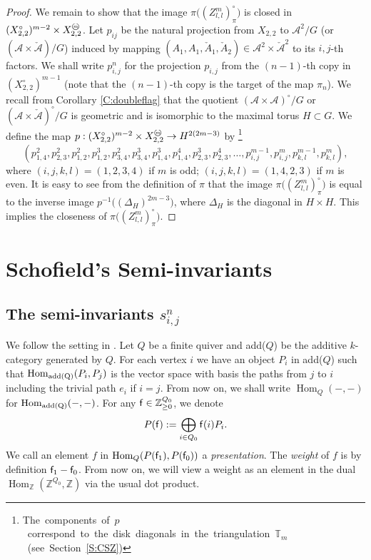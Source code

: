 \documentclass{amsart}
\theoremstyle{definition}
\theoremstyle{remark}
\numberwithin{equation}{section}
\DeclareMathOperator{\Hom}{Hom}
\newcommand{\mc}[1]{\mathcal{#1}}
\newcommand{\mb}[1]{\mathbb{#1}}
\newcommand{\mch}[1]{\check{\mathcal{#1}}}
\newcommand{\f}{{\sf f}}
\newcommand{\zllm}{{Z_{l,l}^m}}
\newcommand{\circm}{{\mathop{\text{\textcircled{\tiny \textit m}}}\nolimits}}
\newcommand{\ijn}{_{i,j}^{n}}
\begin{document}
\begin{proof}
We remain to show that the image $\pi\big((\zllm)^\circ_\pi\big)$ is closed in $(X_{2,2}^\circ)^{m-2} \times X_{2,2}^{\circm}$.
Let $p_{ij}$ be the natural projection from $X_{2,2}$ to $\mc{A}^2/G$ (or $(\mc{A}\times \mch{A})/G$) induced by 
mapping $\left(A_1,A_1,\check{A}_1,\check{A}_2\right)\in \mc{A}^2\times \mch{A}^2$ to its $i,j$-th factors.
We shall write $p_{i,j}^{n}$ for the projection $p_{i,j}$ from the $(n-1)$-th copy in $(X_{2,2}^\circ)^{m-1}$ (note that the $(n-1)$-th copy is the target of the map $\pi_n$).
We recall from Corollary \ref{C:doubleflag} that the quotient $(\mc{A}\times \mc{A})^\circ/G$ or $(\mc{A}\times \mch{A})^\circ/G$ is geometric and is isomorphic to the maximal torus $H\subset G$.
We define the map $p: (X_{2,2}^\circ)^{m-2} \times X_{2,2}^{\circm} \to H^{2(2m-3)}$ by \footnote{\hbox{The components of $p$ correspond to the disk diagonals in the triangulation $\mb{T}_m$ (see Section \ref{S:CSZ})}}
$$\left( p_{1,4}^{2},p_{2,3}^{2},p_{1,2}^{2},p_{1,2}^{3},p_{3,4}^{2},p_{3,4}^{3},p_{1,4}^{3},p_{1,4}^{4},p_{2,3}^{3},p_{2,3}^{4},\dots, p_{i,j}^{m-1},p_{i,j}^{m},p_{k,l}^{m-1},p_{k,l}^{m} \right),$$
where $(i,j,k,l)=(1,2,3,4)$ if $m$ is odd; $(i,j,k,l)=(1,4,2,3)$ if $m$ is even.
It is easy to see from the definition of $\pi$ that the image $\pi\big((\zllm)^\circ_\pi\big)$ is equal to the inverse image $p^{-1}\big((\Delta_H)^{2m-3}\big)$,
where $\Delta_H$ is the diagonal in $H\times H$.
This implies the closeness of $\pi\big((\zllm)^\circ_\pi\big)$.	
\end{proof}



\section{Schofield's Semi-invariants} \label{S:SSI}

\subsection{The semi-invariants $s\ijn$}
We follow the setting in \cite{SV}.
Let $Q$ be a finite quiver and add($Q$) be the additive $k$-category generated by $Q$.
For each vertex $i$ we have an object $P_i$ in add($Q$) such that $\Hom_{\rm{add}(Q)}(P_i,P_j)$ is the vector space with basis the paths from $j$ to $i$ including the trivial path $e_i$ if $i=j$.
From now on, we shall write $\Hom_{Q}(-,-)$ for $\Hom_{\rm{add}(Q)}(-,-)$.
For any $\f\in \mb{Z}_{\geq 0}^{Q_0}$, we denote
$$P(\f):=\bigoplus_{i\in Q_0} \f(i)P_i.$$
We call an element $f$ in $\Hom_{Q}(P(\f_1),P(\f_0))$ a {\em presentation}.
The {\em weight} of $f$ is by definition $\f_1-\f_0$.
From now on, we will view a weight as an element in the dual $\Hom_{\mb{Z}}(\mb{Z}^{Q_0},\mb{Z})$ via the usual dot product.
\end{document}
